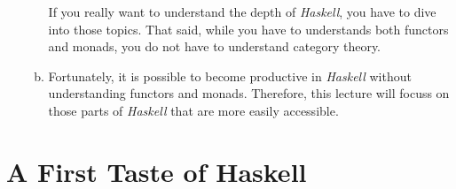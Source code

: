 \documentclass[11pt]{report}
\begin{document}
\begin{enumerate}
\begin{enumerate}[(a)]
        If you really want to understand the depth of \textsl{Haskell}, you have to dive into those topics.
        That said, while you have to understands both functors and monads, you do not have to understand
        category theory.
  \item Fortunately, it is possible to become productive in \textsl{Haskell} without understanding 
        functors and monads.  Therefore, this lecture will focuss on those parts of \textsl{Haskell} that are more easily
        accessible. 
  \end{enumerate}
\end{enumerate}

\section{A First Taste of Haskell}
\end{document}
